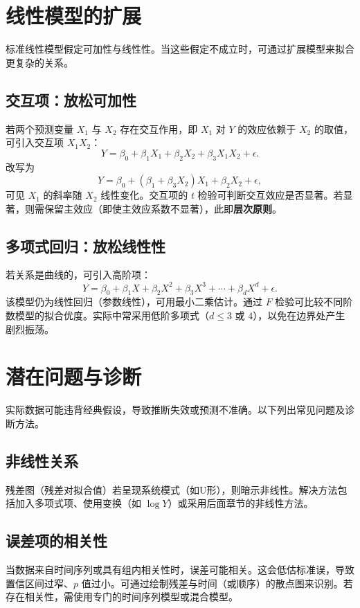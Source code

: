 \documentclass[UTF8]{ctexart}
\numberwithin{equation}{section}
\begin{document}
\section{线性模型的扩展}
\label{sec:extensions}

标准线性模型假定可加性与线性性。当这些假定不成立时，可通过扩展模型来拟合更复杂的关系。

\subsection{交互项：放松可加性}
若两个预测变量 \(X_1\) 与 \(X_2\) 存在交互作用，即 \(X_1\) 对 \(Y\) 的效应依赖于 \(X_2\) 的取值，可引入交互项 \(X_1 X_2\)：
\begin{equation}
Y = \beta_0 + \beta_1 X_1 + \beta_2 X_2 + \beta_3 X_1 X_2 + \epsilon.
\label{eq:interaction}
\end{equation}
改写为
\[
Y = \beta_0 + (\beta_1 + \beta_3 X_2) X_1 + \beta_2 X_2 + \epsilon,
\]
可见 \(X_1\) 的斜率随 \(X_2\) 线性变化。交互项的 \(t\) 检验可判断交互效应是否显著。若显著，则需保留主效应（即使主效应系数不显著），此即\textbf{层次原则}。

\subsection{多项式回归：放松线性性}
若关系是曲线的，可引入高阶项：
\begin{equation}
Y = \beta_0 + \beta_1 X + \beta_2 X^2 + \beta_3 X^3 + \cdots + \beta_d X^d + \epsilon.
\label{eq:poly}
\end{equation}
该模型仍为线性回归（参数线性），可用最小二乘估计。通过 \(F\) 检验可比较不同阶数模型的拟合优度。实际中常采用低阶多项式（\(d\le 3\) 或 \(4\)），以免在边界处产生剧烈振荡。

\section{潜在问题与诊断}
\label{sec:problems}

实际数据可能违背经典假设，导致推断失效或预测不准确。以下列出常见问题及诊断方法。

\subsection{非线性关系}
残差图（残差对拟合值）若呈现系统模式（如U形），则暗示非线性。解决方法包括加入多项式项、使用变换（如 \(\log Y\)）或采用后面章节的非线性方法。

\subsection{误差项的相关性}
当数据来自时间序列或具有组内相关性时，误差可能相关。这会低估标准误，导致置信区间过窄、\(p\) 值过小。可通过绘制残差与时间（或顺序）的散点图来识别。若存在相关性，需使用专门的时间序列模型或混合模型。
\end{document}
